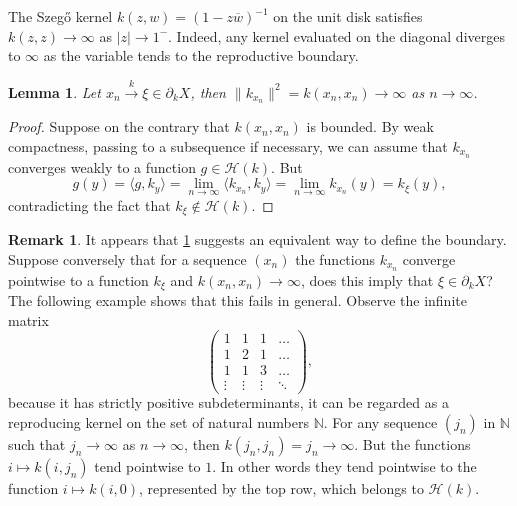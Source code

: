 \documentclass[leqno, final]{article}
\newtheorem{lemma}{Lemma}
\theoremstyle{definition}
\newtheorem{remark}{Remark}
\newcommand{\xto}[1]{\stackrel{#1}{\to}}
\renewcommand{\natural}{\mathbb{N}}
\newcommand{\Hilbert}{\mathcal{H}}
\newcommand{\rand}{\partial}
\newcommand{\la}{\langle}
\newcommand{\ra}{\rangle}
\begin{document}
The Szegő kernel $k(z,w)=(1-z\overline w)^{-1}$ on the unit disk satisfies
$k(z,z)\to\infty$ as $|z|\to1^-$. Indeed, any kernel evaluated on the diagonal
diverges to $\infty$ as the variable tends to the reproductive boundary.
\begin{lemma}\label{lemma:boundary-explosion}
Let $x_n\xto{k}\xi\in\rand_kX$, then $\|k_{x_n}\|^2 = k(x_n,x_n)\to\infty$ as
$n\to\infty$.
\end{lemma}
\begin{proof}
Suppose on the contrary that $k(x_n,x_n)$ is bounded. By weak compactness,
passing to a subsequence if necessary, we can assume that $k_{x_n}$ converges
weakly to a function $g\in\Hilbert(k)$. But \[
	g(y)
	= \la g,k_y\ra
	= \lim_{n\to\infty}\la k_{x_n},k_y\ra
	= \lim_{n\to\infty}k_{x_n}(y)
	= k_\xi(y),
\]
contradicting the fact that $k_\xi\notin\Hilbert(k)$.
\end{proof}
\begin{remark}
It appears that \cref{lemma:boundary-explosion} suggests an equivalent way to
define the boundary. Suppose conversely that for a sequence $(x_n)$ the
functions $k_{x_n}$ converge pointwise to a function $k_\xi$ and
$k(x_n,x_n)\to\infty$, does this imply that $\xi\in\rand_kX$? The following
example shows that this fails in general.  Observe the infinite matrix \[
	\begin{pmatrix}
	1 & 1 & 1 & \ldots \\
	1 & 2 & 1 & \ldots \\
	1 & 1 & 3 & \ldots \\
	\vdots & \vdots & \vdots & \ddots
	\end{pmatrix},
\]
because it has strictly positive subdeterminants,
it can be regarded as a reproducing kernel on the set of natural numbers $\natural$.
For any sequence $(j_n)$ in $\natural$ such that $j_n\to\infty$ as $n\to\infty$, then
$k(j_n,j_n)=j_n\to\infty$. But the functions $i\mapsto k(i,j_n)$ tend pointwise
to $1$. In other words they tend pointwise to the function $i\mapsto k(i,0)$, represented
by the top row, which belongs to $\Hilbert(k)$.
\end{remark}
\end{document}
